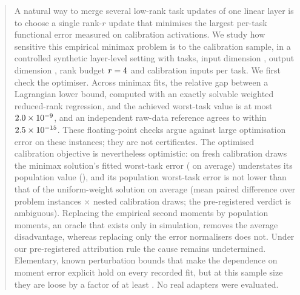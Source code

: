 \begin{abstract}
A natural way to merge several low-rank task updates of one linear layer is to choose a single
rank-$r$ update that minimises the largest per-task functional error measured on calibration
activations. We study how sensitive this empirical minimax problem is to the calibration sample,
in a controlled synthetic layer-level setting with \CfgK{} tasks, input dimension \CfgDin{},
output dimension \CfgDout{}, rank budget $r=\CfgR$ and \CfgNcal{} calibration inputs per task.
We first check the optimiser. Across \STwoNFits{} minimax fits, the relative gap between a
Lagrangian lower bound, computed with an exactly solvable weighted reduced-rank regression, and
the achieved worst-task value is at most $\STwoMaxGapRel$, and an independent raw-data reference
agrees to within $\STwoMaxGDisc$. These floating-point checks argue against large optimisation
error on these instances; they are not certificates. The optimised calibration objective is
nevertheless optimistic: on fresh calibration draws the minimax solution's fitted worst-task
error (\STwoOptFitEEMinimax{} on average) understates its population value
(\STwoOptPopEEMinimax), and its population worst-task error is not lower than that of the
uniform-weight solution on average (mean paired difference \STwoDeltaEE{} over
\CfgNTeachers{} problem instances $\times$ \CfgNResamples{} nested calibration draws; the
pre-registered verdict is ambiguous). Replacing the empirical second moments by population
moments, an oracle that exists only in simulation, removes the average disadvantage, whereas
replacing only the error normalisers does not. Under our pre-registered attribution rule the
cause remains undetermined. Elementary, known perturbation bounds that make the dependence on moment error explicit hold
on every recorded fit, but at this sample size they are loose by a factor of at least
\SThreeMinBoundOverExcess. No real adapters were evaluated.
\end{abstract}
